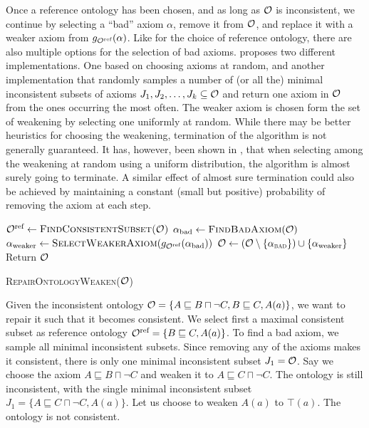 Once a reference ontology has been chosen, and as long as $\mathcal{O}$ is inconsistent, we continue by selecting a ``bad'' axiom $\alpha$, remove it from $\mathcal{O}$, and replace it with a weaker axiom from $g_{\mathcal{O}^\textnormal{ref}}(\alpha)$. Like for the choice of reference ontology, there are also multiple options for the selection of bad axioms. \cite{troquard2018repairing} proposes two different implementations. One based on choosing axioms at random, and another implementation that randomly samples a number of (or all the) minimal inconsistent subsets of axioms $J_1, J_2, \dots, J_k \subseteq \mathcal{O}$ and return one axiom in $\mathcal{O}$ from the ones occurring the most often. The weaker axiom is chosen form the set of weakening by selecting one uniformly at random. While there may be better heuristics for choosing the weakening, termination of the algorithm is not generally guaranteed. It has, however, been shown in \cite{confalonieri2020towards}, that when selecting among the weakening at random using a uniform distribution, the algorithm is almost surely going to terminate. A similar effect of almost sure termination could also be achieved by maintaining a constant (small but positive) probability of removing the axiom at each step.

\begin{algorithm}[ht]
  \begin{algorithmic}
    \State ${\mathcal{O}^\textnormal{ref}} \gets \textsc{FindConsistentSubset(\ensuremath{\mathcal{O}})}$
    \State $\alpha_\textnormal{bad} \gets \textsc{FindBadAxiom}(\mathcal{O})$
    \State $\alpha_\textnormal{weaker} \gets \textsc{SelectWeakerAxiom}(g_{\mathcal{O}^\textnormal{ref}}(\alpha_\textnormal{bad}))$
    \State $\mathcal{O} \gets (\mathcal{O} \setminus \{\alpha_\textsc{bad}\}) \cup \{\alpha_\textnormal{weaker}\}$
    \EndWhile
    \State Return $\mathcal{O}$
  \end{algorithmic}
  \caption{\textsc{RepairOntologyWeaken}($\mathcal{O}$)}
  \label{algo:repair-weaken-alc}
\end{algorithm}

\begin{example}\label{ex:alc-weakening}
  Given the inconsistent ontology $\mathcal{O} = \{ A \sqsubseteq B \sqcap \lnot C, B \sqsubseteq C, A(a) \}$, we want to repair it such that it becomes consistent. We select first a maximal consistent subset as reference ontology ${\mathcal{O}^\textnormal{ref}} = \{ B \sqsubseteq C, A(a) \}$. To find a bad axiom, we sample all minimal inconsistent subsets. Since removing any of the axioms makes it consistent, there is only one minimal inconsistent subset $J_1 = \mathcal{O}$. Say we choose the axiom $A \sqsubseteq B \sqcap \lnot C$ and weaken it to $A \sqsubseteq C \sqcap \lnot C$. The ontology is still inconsistent, with the single minimal inconsistent subset $J_1 = \{ A \sqsubseteq C \sqcap \lnot C, A(a) \}$. Let us choose to weaken $A(a)$ to $\top(a)$. The ontology is not consistent.
\end{example}

